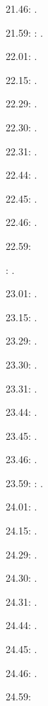 \documentclass[italian]{article}
\begin{document}
21.46:     .

21.59:     
:    .

22.01:     . 

22.15:     . 

22.29:     . 

22.30:     .

22.31:     .

22.44:     .

22.45:     .

22.46:     .

22.59:     

:    .

23.01:     . 

23.15:     . 

23.29:     . 

23.30:     .

23.31:     .

23.44:     .

23.45:     .

23.46:     .

23.59:     
:    .

24.01:     . 

24.15:     . 

24.29:     . 

24.30:     .

24.31:     .

24.44:     .

24.45:     .

24.46:     .

24.59:     
\end{document}
